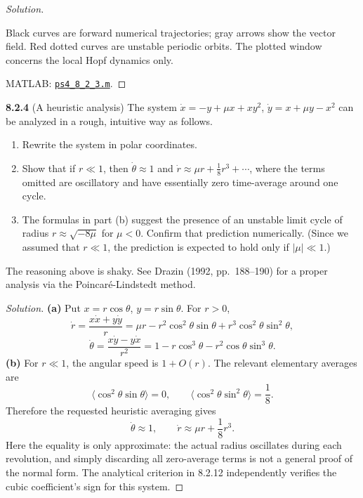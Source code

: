 \documentclass[10pt]{amsart}
\newenvironment{solution}
{\begin{proof}[Solution]}
{\end{proof}}
\begin{document}
\begin{onehalfspace}
\begin{solution}
\begin{center}
\begin{minipage}{\textwidth}
\par\medskip
\end{minipage}
\end{center}
Black curves are forward numerical trajectories; gray arrows show the vector field. Red dotted curves are unstable periodic orbits. The plotted window concerns the local Hopf dynamics only.

\medskip
\noindent MATLAB: \href{https://github.com/chtompki/MathFall2026/blob/main/DynamicalSystems/ProblemSet4/ps4_8_2_3.m}{\nolinkurl{ps4_8_2_3.m}}.

        \end{solution}

        \noindent\textbf{8.2.4}
        (A heuristic analysis) The system $\dot{x}=-y+\mu x+xy^2$, $\dot{y}=x+\mu y-x^2$ can be analyzed in a rough, intuitive way as follows.
        \begin{enumerate}[label=\alph*)]
            \item Rewrite the system in polar coordinates.
            \item Show that if $r\ll 1$, then $\dot{\theta}\approx 1$ and $\dot{r}\approx\mu r+\frac18 r^3+\cdots$, where the terms omitted are oscillatory and have essentially zero time-average around one cycle.
            \item The formulas in part (b) suggest the presence of an unstable limit cycle of radius $r\approx\sqrt{-8\mu}$ for $\mu<0$. Confirm that prediction numerically. (Since we assumed that $r\ll 1$, the prediction is expected to hold only if $|\mu|\ll 1$.)
        \end{enumerate}
        The reasoning above is shaky. See Drazin (1992, pp.\ 188--190) for a proper analysis via the Poincar\'e-Lindstedt method.

        \begin{solution}

\textbf{(a)} Put $x=r\cos\theta$, $y=r\sin\theta$. For $r>0$,
\[
 \dot r=\frac{x\dot x+y\dot y}{r}
 =\mu r-r^2\cos^2\theta\sin\theta
       +r^3\cos^2\theta\sin^2\theta,
\]
\[
 \dot\theta=\frac{x\dot y-y\dot x}{r^2}
 =1-r\cos^3\theta-r^2\cos\theta\sin^3\theta.
\]
\textbf{(b)} For $r\ll1$, the angular speed is $1+O(r)$. The relevant elementary averages are
\[
 \langle\cos^2\theta\sin\theta\rangle=0,
 \qquad \langle\cos^2\theta\sin^2\theta\rangle=\frac18.
\]
Therefore the requested heuristic averaging gives
\[
 \dot\theta\approx1,\qquad \dot r\approx\mu r+\frac18r^3.
\]
Here the equality is only approximate: the actual radius oscillates during each revolution, and simply discarding all zero-average terms is not a general proof of the normal form. The analytical criterion in 8.2.12 independently verifies the cubic coefficient's sign for this system.


\end{solution}
\end{onehalfspace}
\end{document}
